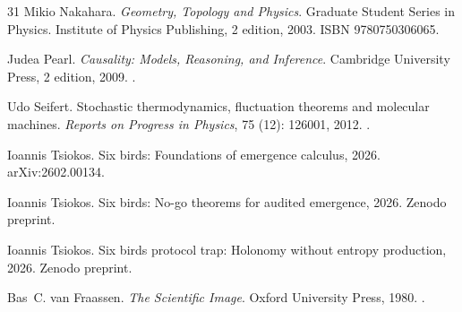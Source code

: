 \documentclass[11pt]{article}
\theoremstyle{definition}
\begin{document}
\begin{thebibliography}{31}
Mikio Nakahara.
\newblock \emph{Geometry, Topology and Physics}.
\newblock Graduate Student Series in Physics. Institute of Physics Publishing,
  2 edition, 2003.
\newblock ISBN 9780750306065.

Judea Pearl.
\newblock \emph{Causality: Models, Reasoning, and Inference}.
\newblock Cambridge University Press, 2 edition, 2009.
\newblock {}.

Udo Seifert.
\newblock Stochastic thermodynamics, fluctuation theorems and molecular
  machines.
\newblock \emph{Reports on Progress in Physics}, 75 (12):
  126001, 2012.
\newblock {}.

Ioannis Tsiokos.
\newblock Six birds: Foundations of emergence calculus, 2026{}.
\newblock arXiv:2602.00134.

Ioannis Tsiokos.
\newblock Six birds: No-go theorems for audited emergence, 2026{}.
\newblock Zenodo preprint.

Ioannis Tsiokos.
\newblock Six birds protocol trap: Holonomy without entropy production,
  2026{}.
\newblock Zenodo preprint.

Bas~C. {van Fraassen}.
\newblock \emph{The Scientific Image}.
\newblock Oxford University Press, 1980.
\newblock {}.

\end{thebibliography}
\end{document}
